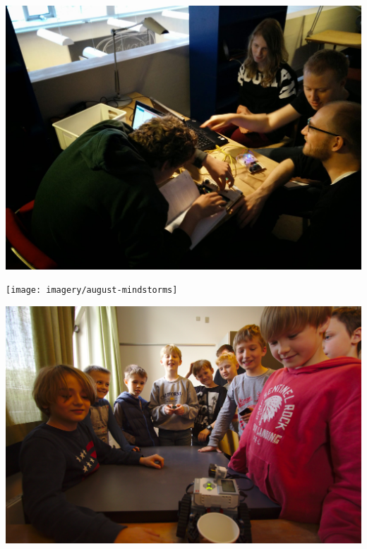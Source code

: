 \documentclass{beamer}
\begin{document}


\begin{frame}
 \vspace{5mm}
 \includegraphics[width=\textwidth]{imagery/arduino-workshop}
\end{frame}

\begin{frame}
 \vspace{5mm}
 \texttt{[image: imagery/august-mindstorms]}
\end{frame}

\begin{frame}
 \vspace{5mm}
 \includegraphics[width=\textwidth]{imagery/mindstorms-presentation}
\end{frame}
\end{document}
